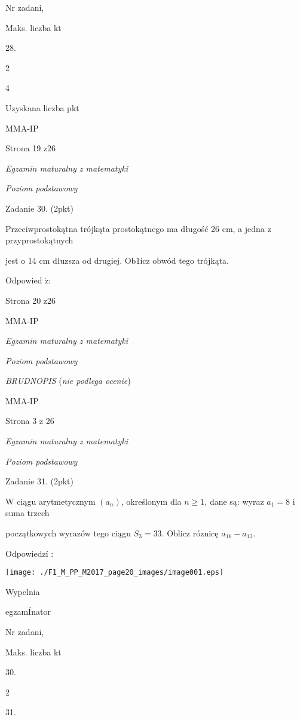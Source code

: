 \documentclass[a4paper,12pt]{article}
\begin{document}
Nr zadani,

Maks. liczba kt

28.

2

4

Uzyskana liczba pkt

MMA-IP

Strona 19 z26





{\it Egzamin maturalny z matematyki}

{\it Poziom podstawowy}

Zadanie 30. (2pkt)

Przeciwprostokątna trójkąta prostokątnego ma długość 26 cm, a jedna z przyprostokątnych

jest o 14 cm dłuzsza od drugiej. Ob1icz obwód tego trójkąta.

Odpowied $\acute{\mathrm{z}}$:

Strona 20 $\mathrm{z}26$

MMA-IP





{\it Egzamin maturalny z matematyki}

{\it Poziom podstawowy}

{\it BRUDNOPIS} ({\it nie podlega ocenie})

MMA-IP

Strona 3 z 26





{\it Egzamin maturalny z matematyki}

{\it Poziom podstawowy}

Zadanie 31. (2pkt)

$\mathrm{W}$ ciągu arytmetycznym $(a_{n})$, określonym dla $n\geq 1$, dane są: wyraz $a_{1}=8$ i suma trzech

początkowych wyrazów tego ciągu $S_{3}=33$. Oblicz róznicę $a_{16}-a_{13}.$

Odpowiedzí :
\begin{center}
\texttt{[image: ./F1\_M\_PP\_M2017\_page20\_images/image001.eps]}
\end{center}
Wypelnia

egzamÍnator

Nr zadani,

Maks. liczba kt

30.

2

31.
\end{document}
